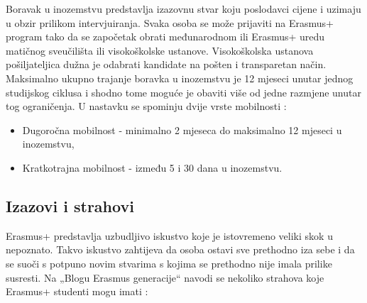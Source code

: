 \documentclass[]{foi}
\begin{document}
Boravak u inozemstvu predstavlja izazovnu stvar koju poslodavci cijene i uzimaju u obzir prilikom intervjuiranja. 
Svaka osoba se može prijaviti na Erasmus+ program tako da se započetak obrati međunarodnom ili Erasmus+ uredu matičnog sveučilišta ili visokoškolske ustanove. 
Visokoškolska ustanova pošiljateljica dužna je odabrati kandidate na pošten i transparetan način. Maksimalno ukupno trajanje boravka u inozemstvu je 12 mjeseci 
unutar jednog studijskog ciklusa i shodno tome moguće je obaviti više od jedne razmjene unutar tog ograničenja. U nastavku se spominju dvije vrste mobilnosti \cite{erasmus2025abroad}:
\begin{itemize}
    \item Dugoročna mobilnost - minimalno 2 mjeseca do maksimalno 12 mjeseci u inozemstvu,
    \item Kratkotrajna mobilnost - između 5 i 30 dana u inozemstvu.    
\end{itemize}

\subsection{Izazovi i strahovi}
Erasmus+ predstavlja uzbudljivo iskustvo koje je istovremeno veliki skok u nepoznato. Takvo iskustvo zahtijeva da osoba ostavi sve prethodno iza sebe i da se suoči s potpuno novim 
stvarima s kojima se prethodno nije imala prilike susresti. Na „Blogu Erasmus generacije“ navodi se nekoliko strahova koje Erasmus+ studenti mogu imati \cite{erasmus_fears_2025}:
\end{document}
